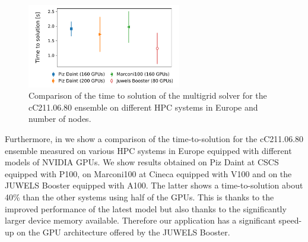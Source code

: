 \begin{figure}
	\includegraphics[width=0.6\textwidth]{plots/comparison.pdf}
	\caption{Comparison of the time to solution of the multigrid solver for the cC211.06.80 ensemble on different HPC systems in Europe and number of nodes.}
	\label{fig:multigrid_comparison}
\end{figure}

Furthermore, in  we show a comparison of the time-to-solution for the cC211.06.80 ensemble measured on various
HPC systems in Europe equipped with different models of NVIDIA GPUs. We show results obtained on Piz Daint at CSCS equipped with P100, on Marconi100 at Cineca equipped with V100 and on the JUWELS Booster equipped with A100. The latter shows a time-to-solution about 40\% than the other systems using half of the GPUs. This is thanks to the improved performance of the latest model but also thanks to the significantly larger device memory available. Therefore our application has a significant speed-up on the GPU architecture offered by the JUWELS Booster.


\endinput
